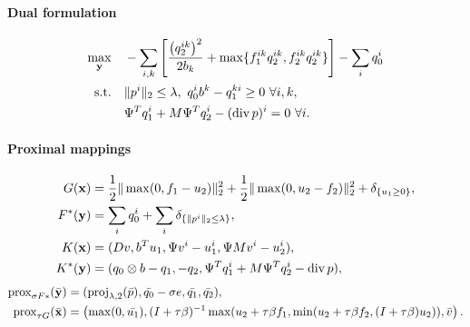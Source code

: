 \paragraph{Dual formulation}
\begin{align*}
    \max_{\mathbf{y}} \quad
        & -\sum_{i,k} \left[
                \frac{\left(q_2^{ik}\right)^2}{2b_k}
                + \max\{f_1^{ik} q_2^{ik},f_2^{ik} q_2^{ik}\}
        \right] - \sum_i q_0^i  \\
    \text{s.t.}\quad
        & \|p^{i}\|_{2} \leq \lambda,
          ~q_0^i b^k - q_1^{ki} \geq 0 ~\forall i, k, \\
        & \Psi^T q_1^i + M \Psi^T q_2^i - (\operatorname{div} p)^i = 0 ~\forall i.
\end{align*}

\paragraph{Proximal mappings}
\begin{align*}
    G(\mathbf{x}) &=
        \frac{1}{2} \|\max(0, f_1 - u_2)\|_2^2
        + \frac{1}{2} \|\max(0, u_2 - f_2)\|_2^2
        + \delta_{\{u_1 \geq 0\}}, \\
    F^*(\mathbf{y}) &=
        \sum_{i} q_0^i
        + \sum_{i} \delta_{\{\|p^{i}\|_{2} \leq \lambda\}}, \\
    K(\mathbf{x}) &= (
        Dv,
        b^T u_1,
        \Psi v^i - u_1^i,
        \Psi M v^i - u_2^i
    ), \\
    K^*(\mathbf{y}) &= (
        q_0 \otimes b - q_1,
        -q_2,
        \Psi^T q_1^i + M \Psi^T q_2^i - \operatorname{div}{p}
    ),
\end{align*}
\begin{align*}
    \operatorname{prox}_{\sigma F*}(\bar{\mathbf{y}})
    &= (
        \operatorname{proj}_{\lambda,2}(\bar{p}),
        \bar{q_0}-\sigma e,
        \bar{q_1},
        \bar{q_2}
   ), \\
    \operatorname{prox}_{\tau G}(\bar{\mathbf{x}})
    &= \left(
        \max(0,\bar{u_1}),
        (I + \tau\beta)^{-1} \max(u_2 + \tau \beta f_1,
                                \min(u_2 + \tau \beta f_2, (I + \tau\beta)u_2)),
        \bar{v}
    \right).
\end{align*}
